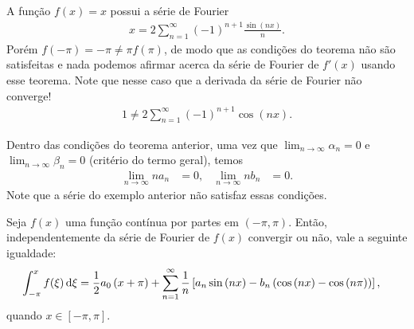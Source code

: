 \begin{exem}
    A fun\c{c}\~{a}o $f(x) = x$ possui a s\'{e}rie de Fourier
    \begin{align*}
        x = 2 \sum_{n = 1}^\infty (-1)^{n + 1} \frac{\sin\left( n x \right)}{n}.
    \end{align*}
    Por\'{e}m $f(-\pi) = -\pi \neq \pi f(\pi)$, de modo que as condi\c{c}\~{o}es do teorema n\~{a}o s\~{a}o satisfeitas e nada podemos afirmar acerca da s\'{e}rie de Fourier de $f'(x)$ usando esse teorema. Note que nesse caso que a derivada da s\'{e}rie de Fourier n\~{a}o converge!
    \begin{align*}
        1 \neq 2 \sum_{n = 1}^\infty (-1)^{n + 1} \cos\left( n x \right).
    \end{align*}
\end{exem}
\begin{obs}
    Dentro das condi\c{c}\~{o}es do teorema anterior, uma vez que $\lim_{n \to \infty} \alpha_n = 0$ e $\lim_{n \to \infty} \beta_n = 0$ (crit\'{e}rio do termo geral), temos
    \begin{align*}
        \lim_{n \to \infty} n a_n &= 0, & \lim_{n \to \infty} n b_n &= 0.
    \end{align*}
    Note que a s\'{e}rie do exemplo anterior n\~{a}o satisfaz essas condi\c{c}\~{o}es.
\end{obs}
\begin{teo}
    Seja $f(x)$ uma fun\c{c}\~{a}o cont\'{i}nua por partes em $(-\pi,\pi)$. Ent\~{a}o, independentemente da s\'{e}rie de Fourier de $f(x)$ convergir ou n\~{a}o, vale a seguinte igualdade:
    \begin{align*}
        \int_{-\pi}^x f(\xi) \, \mathrm{d}\xi &= \frac{1}{2} a_0 \left( x + \pi \right) + \sum_{n = 1}^\infty \frac{1}{n} \left[ a_n \sin\left( n x \right) - b_n \left( \cos\left( n x \right) - \cos\left( n \pi \right) \right) \right],
    \end{align*}
    quando $x \in [-\pi,\pi]$.
\end{teo}
